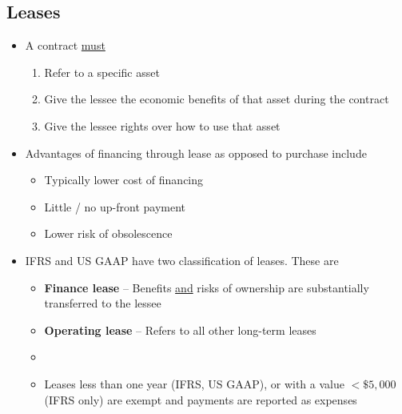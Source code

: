 \documentclass[../notes_compiled.tex]{subfiles}
\begin{document}
\subsection{Leases}
\begin{itemize}
\item A contract \underline{must}
\begin{enumerate}
\item Refer to a specific asset
\item Give the lessee the economic benefits of that asset during the contract
\item Give the lessee rights over how to use that asset
\end{enumerate}
\item Advantages of financing through lease as opposed to purchase include
\begin{itemize}
\item Typically lower cost of financing
\item Little / no up-front payment
\item Lower risk of obsolescence
\end{itemize}
\item IFRS and US GAAP have two classification of leases. These are
\begin{itemize} 
\item \textbf{Finance lease} -- Benefits \underline{and} risks of ownership are substantially transferred to the lessee
\item \textbf{Operating lease} -- Refers to all other long-term leases
\item[]
\item Leases less than one year (IFRS, US GAAP), or with a value $<\$5,000$ (IFRS only) are exempt and payments are reported as expenses
\end{itemize}

\end{itemize}
\end{document}
